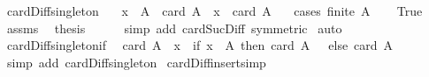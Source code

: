 \begin{isabellebody}
\endisatagproof
{\isafoldproof}%
%
\isadelimproof
\isanewline
%
\endisadelimproof
\isanewline
{}\isamarkupfalse%
\ card{\isacharunderscore}{\kern0pt}Diff{\isacharunderscore}{\kern0pt}singleton{\isacharcolon}{\kern0pt}\isanewline
\ \ \ {\isachardoublequoteopen}x\ {\isasymin}\ A{\isachardoublequoteclose}\ \ {\isachardoublequoteopen}card\ {\isacharparenleft}{\kern0pt}A\ {\isacharminus}{\kern0pt}\ {\isacharbraceleft}{\kern0pt}x{\isacharbraceright}{\kern0pt}{\isacharparenright}{\kern0pt}\ {\isacharequal}{\kern0pt}\ card\ A\ {\isacharminus}{\kern0pt}\ {}{\isachardoublequoteclose}\isanewline
%
\isadelimproof
%
\endisadelimproof
%
\isatagproof
{}\isamarkupfalse%
\ {\isacharparenleft}{\kern0pt}cases\ {\isachardoublequoteopen}finite\ A{\isachardoublequoteclose}{\isacharparenright}{\kern0pt}\isanewline
\ \ \isamarkupfalse%
\ True\isanewline
\ \ \isamarkupfalse%
\ assms\ \isamarkupfalse%
\ {\isacharquery}{\kern0pt}thesis\isanewline
\ \ \ \ \isamarkupfalse%
\ {\isacharparenleft}{\kern0pt}simp\ add{\isacharcolon}{\kern0pt}\ card{\isacharunderscore}{\kern0pt}Suc{\isacharunderscore}{\kern0pt}Diff{}\ {\isacharbrackleft}{\kern0pt}symmetric{\isacharbrackright}{\kern0pt}{\isacharparenright}{\kern0pt}\isanewline
{}\isamarkupfalse%
\ auto%
\endisatagproof
{\isafoldproof}%
%
\isadelimproof
\isanewline
%
\endisadelimproof
\isanewline
{}\isamarkupfalse%
\ card{\isacharunderscore}{\kern0pt}Diff{\isacharunderscore}{\kern0pt}singleton{\isacharunderscore}{\kern0pt}if{\isacharcolon}{\kern0pt}\isanewline
\ \ {\isachardoublequoteopen}card\ {\isacharparenleft}{\kern0pt}A\ {\isacharminus}{\kern0pt}\ {\isacharbraceleft}{\kern0pt}x{\isacharbraceright}{\kern0pt}{\isacharparenright}{\kern0pt}\ {\isacharequal}{\kern0pt}\ {\isacharparenleft}{\kern0pt}if\ x\ {\isasymin}\ A\ then\ card\ A\ {\isacharminus}{\kern0pt}\ {}\ else\ card\ A{\isacharparenright}{\kern0pt}{\isachardoublequoteclose}\isanewline
%
\isadelimproof
\ \ %
\endisadelimproof
%
\isatagproof
{}\isamarkupfalse%
\ {\isacharparenleft}{\kern0pt}simp\ add{\isacharcolon}{\kern0pt}\ card{\isacharunderscore}{\kern0pt}Diff{\isacharunderscore}{\kern0pt}singleton{\isacharparenright}{\kern0pt}%
\endisatagproof
{\isafoldproof}%
%
\isadelimproof
\isanewline
%
\endisadelimproof
\isanewline
{}\isamarkupfalse%
\ card{\isacharunderscore}{\kern0pt}Diff{\isacharunderscore}{\kern0pt}insert{\isacharbrackleft}{\kern0pt}simp{\isacharbrackright}{\kern0pt}{\isacharcolon}{\kern0pt}\isanewline

\end{isabellebody}
